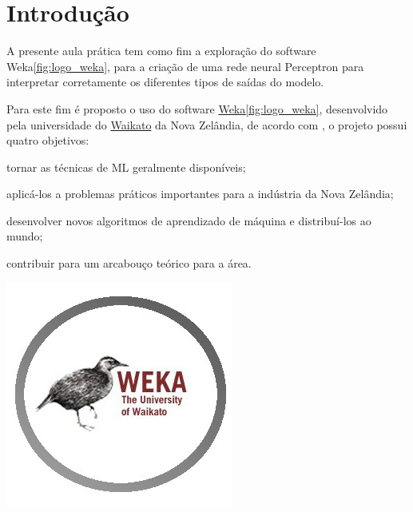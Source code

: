 
\section{Introdução}

\noindent \begin{minipage}[c]{0.6\textwidth}
  \vspace {1cm}
  \par A presente aula prática tem como fim a exploração do software Weka\ref{fig:logo_weka}, para a criação de uma rede neural Perceptron para interpretar corretamente os diferentes tipos de saídas do modelo.
  \par Para este fim é proposto o uso do software \href{https://www.cs.waikato.ac.nz/ml/index.html}{Weka}\ref{fig:logo_weka}, desenvolvido pela universidade do \href{https://www.waikato.ac.nz/}{Waikato} da Nova Zelândia, de acordo com , o projeto possui quatro objetivos:
  \begin{asparaenum}
    \item tornar as técnicas de ML geralmente disponíveis;
    \item aplicá-los a problemas práticos importantes para a indústria da Nova Zelândia;
    \item desenvolver novos algoritmos de aprendizado de máquina e distribuí-los ao mundo;
    \item contribuir para um arcabouço teórico para a área.
  \end{asparaenum}

\end{minipage}
\begin{minipage}[c]{0.4\textwidth}

  \includegraphics[width=\textwidth]{figure/weka-logo.jpg}
  	\label{fig:logo_weka}
\end{minipage}



